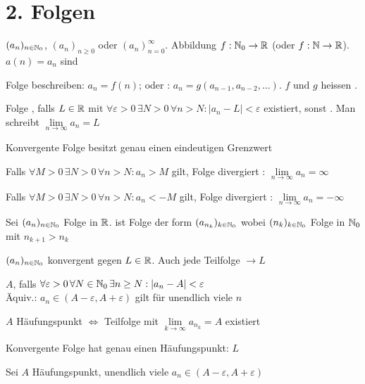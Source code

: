 \section{2. Folgen}
\Def {} $(a_n)_{n \in \mathbb{N}_0}$, $(a_n)_{n\ge 0}$ oder $(a_n)_{n=0}^\infty$. 
Abbildung $f : \mathbb{N}_0 \to \mathbb{R}$ (oder $f : \mathbb{N} \to \mathbb{R}$).  $a(n) = a_n$
sind 

\Def Folge  beschreiben: $a_n = f(n)$;
oder : $a_n = g(a_{n-1}, a_{n-2}, \ldots)$.
$f$ und $g$ heissen .

\Def Folge , falls  $L \in \mathbb{R}$ mit
$\forall \varepsilon > 0 \, \exists N > 0 \, \forall n > N : |a_n - L| < \varepsilon$
existiert, sonst .
Man schreibt $\lim\limits_{n \to \infty} a_n = L$

\Satz Konvergente Folge besitzt genau einen eindeutigen Grenzwert

\Def Falls $\forall M > 0 \, \exists N > 0 \, \forall n > N : a_n > M$ gilt,
Folge divergiert : $\lim\limits_{n\to\infty}a_n = \infty$

Falls $\forall M > 0 \, \exists N > 0 \, \forall n > N : a_n < -M$ gilt,
Folge divergiert : $\lim\limits_{n\to\infty} a_n = -\infty$

\Def Sei $(a_n)_{n \in \mathbb{N}_0}$ Folge in $\mathbb{R}$.
 ist Folge der form $(a_{n_k})_{k \in \mathbb{N}_0}$
wobei $(n_k)_{k \in \mathbb{N}_0}$ Folge in $\mathbb{N}_0$ mit $n_{k+1} > n_k$

\Satz $(a_n)_{n \in \mathbb{N}_0}$ konvergent gegen $L \in \mathbb{R}$. Auch jede Teilfolge $\to L$

\Def {} $A$, falls
$\forall \varepsilon > 0 \, \forall N \in \mathbb{N}_0 \, \exists n\ge N : |a_n - A| < \varepsilon$ \\
Äquiv.: $a_n \in (A-\varepsilon, A+\varepsilon)$ gilt für unendlich viele $n$

\Satz $A$ Häufungspunkt $\iff$ Teilfolge mit $\lim\limits_{k \to \infty} a_{n_k} = A$ existiert

\Kor Konvergente Folge hat genau einen Häufungspunkt: $L$

\Kor Sei $A$ Häufungspunkt, unendlich viele $a_n \in (A-\varepsilon, A+\varepsilon)$


